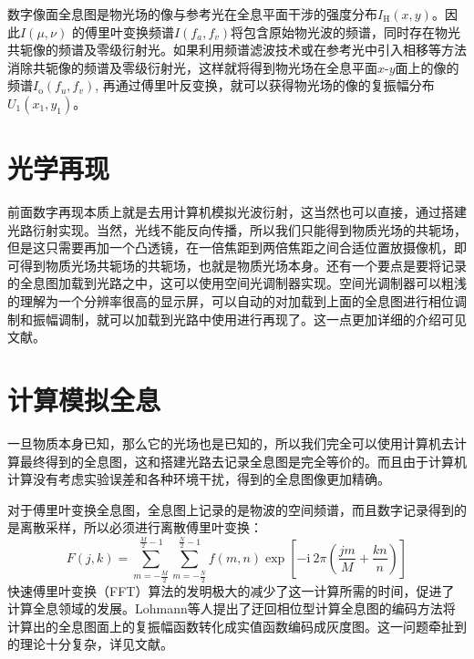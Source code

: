 \documentclass{WHUReport}
\begin{document}
\begin{multicols}{2}
	数字像面全息图是物光场的像与参考光在全息平面干涉的强度分布$I_{\mathrm{H}}(x,y)$。因此$I(\mu,\nu)$ 的傅里叶变换频谱$I(f_a,f_v)$将包含原始物光波的频谱，同时存在物光共轭像的频谱及零级衍射光。如果利用频谱滤波技术或在参考光中引入相移等方法消除共轭像的频谱及零级衍射光，这样就将得到物光场在全息平面$x\mbox{-}y$面上的像的频谱$I_{\mathrm{o}}(f_u,f_v)$, 再通过傅里叶反变换，就可以获得物光场的像的复振幅分布$U_1(x_1,y_1)$。
	\section{光学再现}	
	前面数字再现本质上就是去用计算机模拟光波衍射，这当然也可以直接，通过搭建光路衍射实现。当然，光线不能反向传播，所以我们只能得到物质光场的共轭场，但是这只需要再加一个凸透镜，在一倍焦距到两倍焦距之间合适位置放摄像机，即可得到物质光场共轭场的共轭场，也就是物质光场本身。还有一个要点是要将记录的全息图加载到光路之中，这可以使用空间光调制器实现。空间光调制器可以粗浅的理解为一个分辨率很高的显示屏，可以自动的对加载到上面的全息图进行相位调制和振幅调制，就可以加载到光路中使用进行再现了。这一点更加详细的介绍可见文献\cite{ref10}。
	\section{计算模拟全息}
	一旦物质本身已知，那么它的光场也是已知的，所以我们完全可以使用计算机去计算最终得到的全息图，这和搭建光路去记录全息图是完全等价的。而且由于计算机计算没有考虑实验误差和各种环境干扰，得到的全息图像更加精确。
	
	对于傅里叶变换全息图，全息图上记录的是物波的空间频谱，而且数字记录得到的是离散采样，所以必须进行离散傅里叶变换：
	\begin{equation}
		F(j,k)=\sum_{m=-\frac M2}^{\frac M2-1}\sum_{m=-\frac N2}^{\frac N2-1}f(m,n)\exp[-\mathrm{i~}2\pi(\frac{jm}M+\frac{kn}n)]
	\end{equation}
	快速傅里叶变换（FFT）算法的发明极大的减少了这一计算所需的时间，促进了计算全息领域的发展。Lohmann等人提出了迂回相位型计算全息图的编码方法将计算出的全息图面上的复振幅函数转化成实值函数编码成灰度图。这一问题牵扯到的理论十分复杂，详见文献\cite{ref12}。

\end{multicols}
\end{document}
